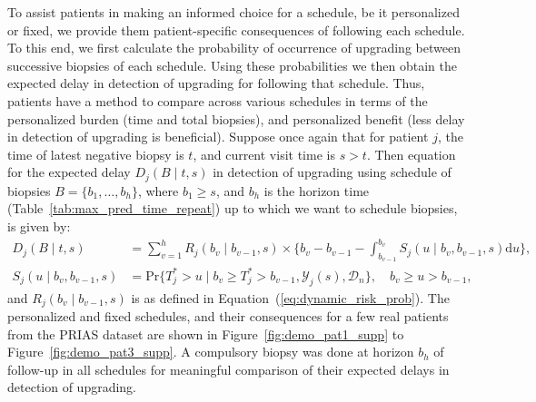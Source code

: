 To assist patients in making an informed choice for a schedule, be it personalized or fixed, we provide them patient-specific consequences of following each schedule. To this end, we first calculate the probability of occurrence of upgrading between successive biopsies of each schedule. Using these probabilities we then obtain the expected delay in detection of upgrading for following that schedule. Thus, patients have a method to compare across various schedules in terms of the personalized burden (time and total biopsies), and personalized benefit (less delay in detection of upgrading is beneficial). Suppose once again that for patient $j$, the time of latest negative biopsy is $t$, and current visit time is $s > t$. Then equation for the expected delay $D_j(B \mid t,s)$ in detection of upgrading using schedule of biopsies $B = \{b_1, \ldots, b_h\}$, where $b_1 \geq s$, and $b_h$ is the horizon time (Table~\ref{tab:max_pred_time_repeat}) up to which we want to schedule biopsies, is given by:
\begin{equation}
\label{eq:expected_delay}
\begin{split}
D_j(B \mid t,s) &= \sum_{v=1}^{h} R_j(b_v\mid b_{v-1},s) \times  \Big\{b_{v} - b_{v-1} - \int_{b_{v-1}}^{b_v} S_j(u \mid b_v, b_{v-1}, s) \mathrm{d}u \Big\},\\
S_j(u \mid b_v, b_{v-1}, s) &= \mbox{Pr}\big\{T^*_j > u \mid b_{v} \geq T^*_j > b_{v-1}, \mathcal{Y}_{j}(s), \mathcal{D}_n\big\}, \quad b_{v} \geq u > b_{v-1},
\end{split}
\end{equation}
and $R_j(b_v\mid b_{v-1},s)$ is as defined in Equation~(\ref{eq:dynamic_risk_prob}). The personalized and fixed schedules, and their consequences for a few real patients from the PRIAS dataset are shown in Figure~\ref{fig:demo_pat1_supp} to Figure~\ref{fig:demo_pat3_supp}. A compulsory biopsy was done at horizon $b_h$ of follow-up in all schedules for meaningful comparison of their expected delays in detection of upgrading.

